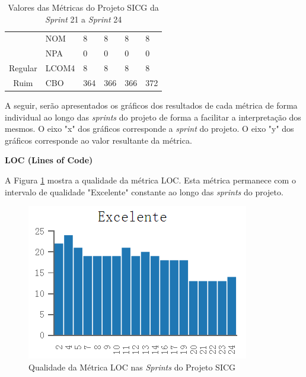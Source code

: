 \begin{table}[H]
\begin{tabular}{|c|l|l|l|l|l|}
                                                   & NOM              & 8                  & 8                  & 8                  & 8                  \\ \cline{2-6} 
                                                   & NPA              & 0                  & 0                  & 0                  & 0                  \\ \hline
Regular                                            & LCOM4            & 8                  & 8                  & 8                  & 8                  \\ \hline
Ruim                                               & CBO              & 364                & 366                & 366                & 372                \\ \hline
\end{tabular}
\caption{Valores das Métricas do Projeto SICG da \textit{Sprint} 21 a \textit{Sprint} 24}
		\label{metricasprint4}
\end{table}


A seguir, serão apresentados os gráficos dos resultados de cada métrica de forma individual ao longo das \textit{sprints} do projeto de forma a facilitar a interpretação dos mesmos. O eixo "x" dos gráficos corresponde a \textit{sprint} do projeto. O eixo "y" dos gráficos corresponde ao valor resultante da métrica.

\textbf{LOC (Lines of Code)}

A Figura \ref{loc} mostra a qualidade da métrica LOC. Esta métrica permanece com o intervalo de qualidade "Excelente" constante ao longo das \textit{sprints} do projeto.

\begin{figure}[H]
		\centering
			\includegraphics[scale=1.0]{figuras/loc.png}
		\caption{Qualidade da Métrica LOC nas \textit{Sprints} do Projeto SICG}
		\label{loc}
\end{figure}

